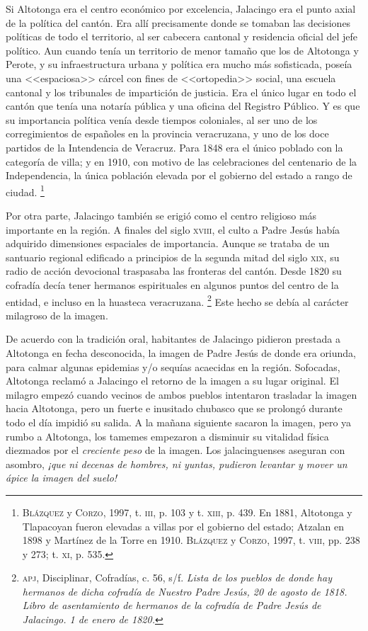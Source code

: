 \documentclass[14pt,twoside,final]{extbook} %
\let\oldfootnote\footnote
\renewcommand\footnote[1]{%
\oldfootnote{\hspace{1mm}#1}}
\begin{document}
Si Altotonga era el centro económico por excelencia, Jalacingo era el punto axial de la política del cantón. Era allí precisamente donde se tomaban las decisiones políticas de todo el territorio, al ser cabecera cantonal y residencia oficial del jefe político. Aun cuando tenía un territorio de menor tamaño que los de Altotonga y Perote, y su infraestructura urbana y política era mucho más sofisticada, poseía una <<espaciosa>> cárcel con fines de <<ortopedia>> social, una escuela cantonal y los tribunales de impartición de justicia. Era el único lugar en todo el cantón que tenía una notaría pública y una oficina del Registro Público. Y es que su importancia política venía desde tiempos coloniales, al ser uno de los corregimientos de españoles en la provincia veracruzana, y uno de los doce partidos de la Intendencia de Veracruz. Para 1848 era el único poblado con la categoría de villa; y en 1910, con motivo de las celebraciones del centenario de la Independencia, la única población elevada por el gobierno del estado a rango de ciudad.\footnote{\textsc{Blázquez} y \textsc{Corzo}, 1997, t. \textsc{iii}, p. 103 y t. \textsc{xiii}, p. 439. En 1881, Altotonga y Tlapacoyan fueron elevadas a villas por el gobierno del estado; Atzalan en 1898 y Martínez de la Torre en 1910. \textsc{Blázquez} y \textsc{Corzo}, 1997, t. \textsc{viii}, pp. 238 y 273; t. \textsc{xi}, p. 535.}

Por otra parte, Jalacingo también se erigió como el centro religioso más importante en la región. A finales del siglo \textsc{xviii}, el culto a Padre Jesús había adquirido dimensiones espaciales de importancia. Aunque se trataba de un santuario regional edificado a principios de la segunda mitad del siglo \textsc{xix}, su radio de acción devocional traspasaba las fronteras del cantón. Desde 1820 su cofradía decía tener hermanos espirituales en algunos puntos del centro de la entidad, e incluso en la huasteca veracruzana.\footnote{\textsc{apj}, Disciplinar, Cofradías, c. 56, s/f. \emph{Lista de los pueblos de donde hay hermanos de dicha cofradía de Nuestro Padre Jesús, 20 de agosto de 1818. Libro de asentamiento de hermanos de la cofradía de Padre Jesús de Jalacingo. 1 de enero de 1820.}} Este hecho se debía al carácter milagroso de la imagen.

De acuerdo con la tradición oral, habitantes de Jalacingo pidieron prestada a Altotonga en fecha desconocida, la imagen de Padre Jesús de donde era oriunda, para calmar algunas epidemias y/o sequías acaecidas en la región. Sofocadas, Altotonga reclamó a Jalacingo el retorno de la imagen a su lugar original. El milagro empezó cuando vecinos de ambos pueblos intentaron trasladar la imagen hacia Altotonga, pero un fuerte e inusitado chubasco que se prolongó durante todo el día impidió su salida. A la mañana siguiente sacaron la imagen, pero ya rumbo a Altotonga, los tamemes empezaron a disminuir su vitalidad física diezmados por el \emph{creciente peso} de la imagen. Los jalacinguenses aseguran con asombro, \emph{¡que ni decenas de hombres, ni yuntas, pudieron levantar y mover un ápice la imagen del suelo!}
\end{document}
